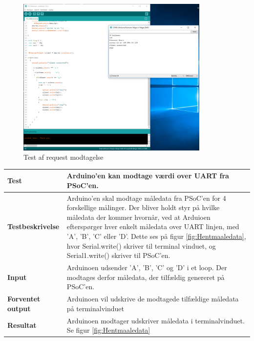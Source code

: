 \begin{figure}[H] %
	\centering
	\includegraphics[width=0.85\textwidth]{Test/ModultestStyringsenhed/EthernettestArduinoTerminal}
	\caption{Test af request modtagelse}
	\label{fig:RequestModtagelse}
\end{figure}

\begin{center}
	\begin{tabular}{ | m{} | m{}|} 
		\hline
		\textbf{Test}					&Arduino'en kan modtage værdi over UART fra PSoC'en.   \\ \hline
		\textbf{Testbeskrivelse}		&Arduino'en skal modtage måledata fra PSoC'en for 4 forskellige målinger. Der bliver holdt styr på hvilke måledata der kommer hvornår, ved at Arduioen efterspørger hver enkelt måledata over UART linjen, med 'A', 'B', 'C' eller 'D'. Dette ses på figur \ref{fig:Hentmaaledata}, hvor Serial.write() skriver til terminal vinduet, og Serial1.write() skriver til PSoC'en. \\ \hline
		\textbf{Input}					& Arduinoen udsender 'A', 'B', 'C' og 'D' i et loop. Der modtages derfor måledata, der tilfældig genereret på PSoC'en.  \\ \hline
		\textbf{Forventet output}		&Arduinoen vil udskrive de modtagede tilfældige måledata på terminalvinduet \\ \hline
		\textbf{Resultat}				&Arduinoen modtager udskriver måledata i terminalvinduet. Se figur \ref{fig:Hentmaaledata} \\ \hline
	\end{tabular}
\end{center}

